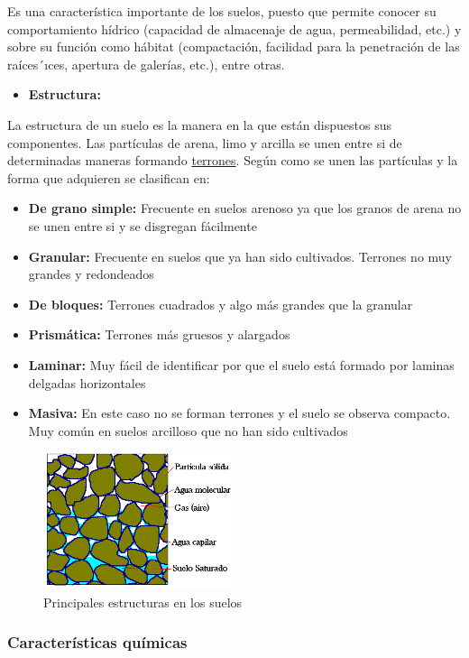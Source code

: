 \documentclass[a4paper,12pt,oneside]{article}
\begin{document}
 Es una característica importante de los suelos, puesto que permite conocer su
comportamiento hídrico (capacidad de almacenaje de agua, permeabilidad, etc.) y
sobre su función como hábitat (compactación, facilidad para la penetración de
las raíces´ıces, apertura de galerías, etc.), entre otras.
\begin{itemize}
\item \textbf{Estructura:}
\end{itemize}
La estructura de un suelo es la manera en la que están dispuestos sus
componentes. Las partículas de arena, limo y arcilla se unen entre si de
determinadas maneras formando \uline{terrones}. Según como se unen las partículas y la
forma que adquieren se clasifican en:
\begin{itemize}
\item \textbf{De grano simple:} Frecuente en suelos arenoso ya que los granos
de arena no se unen entre si y se disgregan fácilmente
\item \textbf{Granular:} Frecuente en suelos que ya han sido cultivados. Terrones no muy
grandes y redondeados
\item \textbf{De bloques:} Terrones cuadrados y algo más grandes que la granular
\item \textbf{Prismática:} Terrones más gruesos y alargados
\item \textbf{Laminar:} Muy fácil de identificar por que el suelo está formado por laminas
delgadas horizontales
\item \textbf{Masiva:} En este caso no se forman terrones y el suelo se observa
compacto. Muy común en suelos arcilloso que no han sido cultivados
\end{itemize}
\begin{center}
\begin{figure}[htbp]
\centering
\includegraphics[width=0.5\textwidth]{./img_uf1596/porosidad.PNG}
\caption{Principales estructuras en los suelos}
\end{figure}
\end{center}
\subsubsection{Características químicas}
\label{sec:org8a241da}
\end{document}
